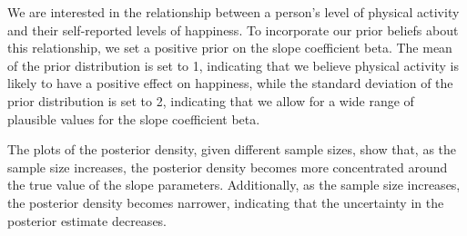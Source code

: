 \documentclass{article}
\begin{document}
We are interested in the relationship between a person's level of
physical activity and their self-reported levels of happiness. To
incorporate our prior beliefs about this relationship, we set a positive
prior on the slope coefficient beta. The mean of the prior distribution
is set to 1, indicating that we believe physical activity is likely to
have a positive effect on happiness, while the standard deviation of the
prior distribution is set to 2, indicating that we allow for a wide
range of plausible values for the slope coefficient beta.

The plots of the posterior density, given different sample sizes, show
that, as the sample size increases, the posterior density becomes more
concentrated around the true value of the slope parameters.
Additionally, as the sample size increases, the posterior density
becomes narrower, indicating that the uncertainty in the posterior
estimate decreases.
\end{document}
